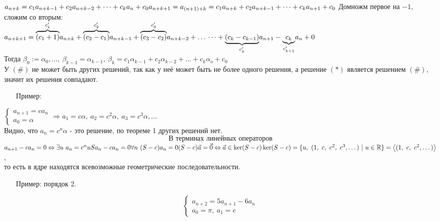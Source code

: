 \documentclass[12pt, letterpaper, twoside]{article}
\newcommand{\mb}[1]{\mathbb{#1}}
\begin{document}
$a_{n + k} = c_1 a_{n + k - 1} + c_2 a_{n + k - 2} + \dots + c_k a_n + c_0\\
a_{n + k + 1} = a_{(n + 1) + k} = c_1 a_{n + k} + c_2 a_{n + k - 1} + \dots + c_k a_{n + 1} + c_0\\$
Домножм первое на $-1$, сложим со вторым:\\
$a_{n + k + 1} = \overset{c_1'}{\overbrace{(c_1 + 1)}} a_{n + k} + \overset{c_2'}{\overbrace{(c_2 - c_1)}}a_{n + k - 1} + \overset{c_3'}{\overbrace{(c_3 - c_2)}}a_{n + k - 2} +\dots\\
\dots + \underset{c'_k}{\underbrace{(c_k - c_{k - 1})}}a_{n + 1} -\underset{c_{k + 1}'}{\underbrace{c_k}} a_n + 0$\\
Тогда $\beta_0 := \alpha_0,\dots,\ \beta_{k - 1} = \alpha_{k - 1},\ \beta_k = c_1 \alpha_{k - 1} + c_2 \alpha_{k - 2} + \dots + c_k \alpha_o + c_0$\\
У $(\#)$ не может быть других решений, так как у неё может быть не более одного решения, а решение $(*)$ является решением $(\#)$, значит их решения совпадают.\\
\begin{enumerate}
    \item[Пример:]
\end{enumerate}
$\begin{cases}
    a_{n + 1} = c a_n\\
    a_0 = \alpha
\end{cases} \Rightarrow a_1 = c\alpha,\ a_2 = c^2 \alpha,\ a_3 = c^3 \alpha,\dots$\\
Видно, что $a_n = c^n \alpha$ - это решение, по теореме 1 других решений нет.
\[\text{В терминах линейных операторов}\]
$a_{n + 1} - ca_n = 0\Leftrightarrow \exists u\ a_n = c^n u\\
Sa_n - ca_n = 0\\
\forall n\ (S - c)a_n = 0\\
(S - c)\vec{a} = \vec{0}\Leftrightarrow \vec{a} \in \ker (S - c)\\
\ker (S - c) = \{u,\ (1,\ c,\ c^2,\ c^3,\dots)\ |\ u\in \mb{R}\} = \left< (1,\ c,\ c^2,\dots) \right>$,\\
то есть в ядре находятся всевозможные геометрические последовательности.\\
\begin{enumerate}
    \item[Пример:] порядок 2.
\end{enumerate}
\[\begin{cases}
    a_{n + 2} = 5a_{n + 1} - 6a_n\\
    a_0 = \pi,\ a_1 = e
\end{cases}\]
\end{document}
